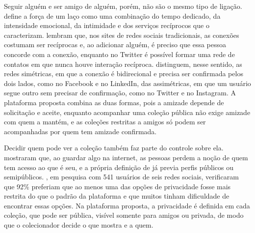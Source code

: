 Seguir alguém e ser amigo de alguém, porém, não são o mesmo tipo de ligação.  define a força de um laço como uma
combinação do tempo dedicado, da intensidade emocional, da intimidade e dos serviços recíprocos que o caracterizam.  lembram que,
nos sites de redes sociais tradicionais, as conexões costumam ser recíprocas e, ao adicionar alguém, é preciso que essa pessoa concorde com a conexão,
enquanto no Twitter é possível formar uma rede de contatos em que nunca houve interação recíproca.  distinguem, nesse sentido, as
redes simétricas, em que a conexão é bidirecional e precisa ser confirmada pelos dois lados, como no Facebook e no LinkedIn, das assimétricas, em que um
usuário segue outro sem precisar de confirmação, como no Twitter e no Instagram. A plataforma proposta combina as duas formas, pois a amizade depende de
solicitação e aceite, enquanto acompanhar uma coleção pública não exige amizade com quem a mantém, e as coleções restritas a amigos só podem ser acompanhadas
por quem tem amizade confirmada.

Decidir quem pode ver a coleção também faz parte do controle sobre ela.  mostraram que, ao guardar algo na internet, as pessoas
perdem a noção de quem tem acesso ao que é seu, e a própria definição de  já previa perfis públicos ou semipúblicos.
, em pesquisa com 541 usuários de seis redes sociais, verificaram que 92\% preferiam que ao menos uma das opções de
privacidade fosse mais restrita do que o padrão da plataforma e que muitos tinham dificuldade de encontrar essas opções. Na plataforma proposta, a privacidade
é definida em cada coleção, que pode ser pública, visível somente para amigos ou privada, de modo que o colecionador decide o que mostra e a quem.

